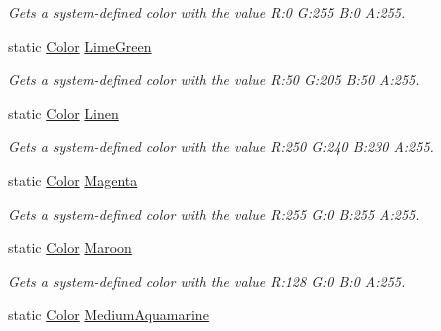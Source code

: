 \begin{DoxyCompactItemize}
\begin{DoxyCompactList}\small\item\em Gets a system-\/defined color with the value R\+:0 G\+:255 B\+:0 A\+:255.\end{DoxyCompactList}\item 
static \hyperlink{structMicrosoft_1_1Xna_1_1Framework_1_1Color}{Color} \hyperlink{structMicrosoft_1_1Xna_1_1Framework_1_1Color_afdab54a255b406dff26d54b848967986}{Lime\+Green}
\begin{DoxyCompactList}\small\item\em Gets a system-\/defined color with the value R\+:50 G\+:205 B\+:50 A\+:255.\end{DoxyCompactList}\item 
static \hyperlink{structMicrosoft_1_1Xna_1_1Framework_1_1Color}{Color} \hyperlink{structMicrosoft_1_1Xna_1_1Framework_1_1Color_af559c4940b4b1a3e96ef1c48bfbd3f69}{Linen}
\begin{DoxyCompactList}\small\item\em Gets a system-\/defined color with the value R\+:250 G\+:240 B\+:230 A\+:255.\end{DoxyCompactList}\item 
static \hyperlink{structMicrosoft_1_1Xna_1_1Framework_1_1Color}{Color} \hyperlink{structMicrosoft_1_1Xna_1_1Framework_1_1Color_a6524b76acd2596d1e2472551b34afe4e}{Magenta}
\begin{DoxyCompactList}\small\item\em Gets a system-\/defined color with the value R\+:255 G\+:0 B\+:255 A\+:255.\end{DoxyCompactList}\item 
static \hyperlink{structMicrosoft_1_1Xna_1_1Framework_1_1Color}{Color} \hyperlink{structMicrosoft_1_1Xna_1_1Framework_1_1Color_a07a8b867df079db25092fa3802209921}{Maroon}
\begin{DoxyCompactList}\small\item\em Gets a system-\/defined color with the value R\+:128 G\+:0 B\+:0 A\+:255.\end{DoxyCompactList}\item 
static \hyperlink{structMicrosoft_1_1Xna_1_1Framework_1_1Color}{Color} \hyperlink{structMicrosoft_1_1Xna_1_1Framework_1_1Color_a624b916afc6757d970cf964e5a9649bf}{Medium\+Aquamarine}

\end{DoxyCompactItemize}
